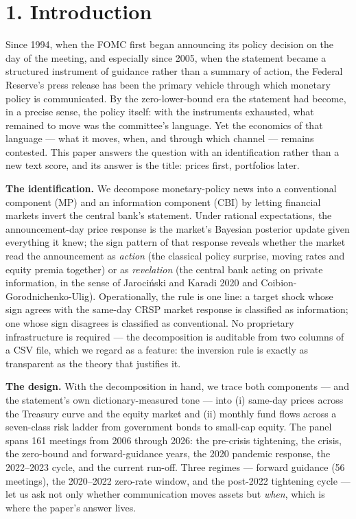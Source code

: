 \section{1. Introduction}\label{introduction}

Since 1994, when the FOMC first began announcing its policy decision on the day of the meeting, and especially since 2005, when the statement became a structured instrument of guidance rather than a summary of action, the Federal Reserve's press release has been the primary vehicle through which monetary policy is communicated. By the zero-lower-bound era the statement had become, in a precise sense, the policy itself: with the instruments exhausted, what remained to move was the committee's language. Yet the economics of that language --- what it moves, when, and through which channel --- remains contested. This paper answers the question with an identification rather than a new text score, and its answer is the title: prices first, portfolios later.

\textbf{The identification.} We decompose monetary-policy news into a conventional component (MP) and an information component (CBI) by letting financial markets invert the central bank's statement. Under rational expectations, the announcement-day price response is the market's Bayesian posterior update given everything it knew; the sign pattern of that response reveals whether the market read the announcement as \emph{action} (the classical policy surprise, moving rates and equity premia together) or as \emph{revelation} (the central bank acting on private information, in the sense of Jarociński and Karadi 2020 and Coibion-Gorodnichenko-Ulig). Operationally, the rule is one line: a target shock whose sign agrees with the same-day CRSP market response is classified as information; one whose sign disagrees is classified as conventional. No proprietary infrastructure is required --- the decomposition is auditable from two columns of a CSV file, which we regard as a feature: the inversion rule is exactly as transparent as the theory that justifies it.

\textbf{The design.} With the decomposition in hand, we trace both components --- and the statement's own dictionary-measured tone --- into (i) same-day prices across the Treasury curve and the equity market and (ii) monthly fund flows across a seven-class risk ladder from government bonds to small-cap equity. The panel spans 161 meetings from 2006 through 2026: the pre-crisis tightening, the crisis, the zero-bound and forward-guidance years, the 2020 pandemic response, the 2022--2023 cycle, and the current run-off. Three regimes --- forward guidance (56 meetings), the 2020--2022 zero-rate window, and the post-2022 tightening cycle --- let us ask not only whether communication moves assets but \emph{when}, which is where the paper's answer lives.

